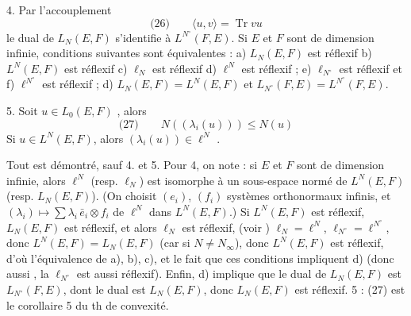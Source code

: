 \documentclass[11pt,a4paper]{article}
\begin{document}
4. Par l'accouplement
\[
  \text{(26)}\qquad \langle u, v \rangle = \operatorname{Tr} vu
\]
le dual de $L_N(E,F)$ s'identifie à $L^{N^{\circ}}(F,E)$. Si $E$ et $F$ sont de dimension infinie,    conditions suivantes sont équivalentes : a) $L_N(E,F)$ est réflexif  b) $L^N(E,F)$ est réflexif c) $\ell_N$ est réflexif \struck{\ill{}} d) $\ell^N$ est réflexif ; e) $\ell_{N^{\circ}}$ est réflexif et f) $\ell^{N^{\circ}}$ est réflexif ; d) $L_N(E,F) = L^N(E,F)$ et $L_{N^{\circ}}(F,E) = L^{N^{\circ}}(F,E)$. 

5.  Soit $u \in L_0(E,F)$ , alors
\[
  \text{(27)}\qquad N((\lambda_i(u))) \leq N(u)
\]
 Si $u \in L^N(E,F)$, alors $(\lambda_i(u)) \in \ell^N$ .

Tout est démontré, sauf 4. et 5. Pour 4, on note : si $E$ et $F$ sont de dimension infinie, alors $\ell^N$ (resp. $\ell_N$) est isomorphe à un sous-espace normé de $L^N(E,F)$ (resp. $L_N(E,F)$). (On choisit $(e_i)$, $(f_i)$ systèmes orthonormaux infinis, et $(\lambda_i) \mapsto \sum \lambda_i\,\bar{e}_i \otimes f_i$ de $\ell^N$ dans $L^N(E,F)$.)  Si $L^N(E,F)$ est réflexif, $L_N(E,F)$ est réflexif, et alors $\ell_N$ est réflexif, \struck{\ill{}}  (voir \ill{}) $\ell_N = \ell^N$, $\ell_{N^{\circ}} = \ell^{N^{\circ}}$, donc $L^N(E,F) = L_N(E,F)$ (car \ill{} si $N \neq N_\infty$), donc $L^N(E,F)$ est réflexif, d'où l'équivalence de a), b), c), et le fait que ces conditions impliquent d) (donc aussi   , \ill{} la  \ill{} $\ell_{N^{\circ}}$ est aussi réflexif). Enfin, d) implique que le dual de $L_N(E,F)$ est $L_{N^{\circ}}(F,E)$,   dont le dual est $L_N(E,F)$, donc $L_N(E,F)$ est réflexif.
5 : (27)  est le corollaire 5 du  th de convexité.
\end{document}
